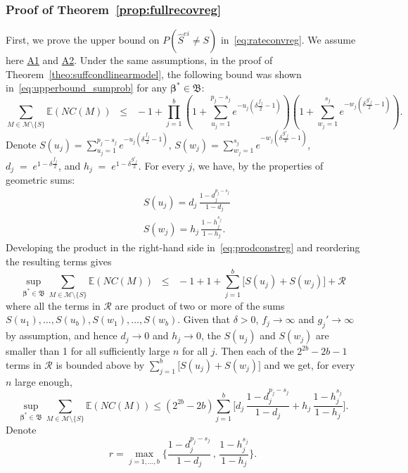 \documentclass[
  12pt]{article}
\newcommand{\E}{\mathbb{E}}
\newcommand{\M}{\mathcal{M}}
\newcommand{\bbeta}{\boldsymbol{\beta}}
\newcommand{\bB}{\mathfrak{B}}
\begin{document}
 \subsubsection{Proof of Theorem~\ref{prop:fullrecovreg}}

First, we prove the upper bound on $P(\hat{S}^{ei} \neq S)$ in~\eqref{eq:rateconvreg}. We assume here \hyperlink{lab:A1}{A1} and \hyperlink{lab:A2}{A2}. Under the same assumptions, in the proof of Theorem~\ref{theo:suffcondlinearmodel}, the following bound was shown in~\eqref{eq:upperbound_sumprob} for any $\bbeta^*\in \bB$:
\begin{equation}\label{eq:prodconstreg}
 \sum_{M \in \M\setminus \{S\}} \E\left(NC(M)\right)
    \;\;\leq\;\; - 1+\prod_{j=1}^b\left(1+\sum_{u_j=1}^{p_j-s_j}e^{-u_j\left(\delta \tfrac{f_j}{2}-1\right)}\right)\left(1+
    \sum_{w_j=1}^{s_j}    e^{-w_j\left(\delta \tfrac{g'_j}{2}-1\right)}\right) .
\end{equation}
Denote $S(u_j)=\sum_{u_j=1}^{p_j-s_j}e^{-u_j\left(\delta \tfrac{f_j}{2}-1\right)}$,  $S(w_j)=\sum_{w_j=1}^{s_j}    e^{-w_j\left(\delta \tfrac{g'_j}{2}-1\right)}$, $d_j\;=\;e^{1-\delta \tfrac{f_j}{2}}$, and $h_j\;=\;e^{1-\delta \tfrac{g'_j}{2}}$. For every $j$, we have, by the properties of geometric sums:
\begin{align*}
    &S(u_j)
    =d_j\,\frac{1-d_j^{p_j-s_j}}{1-d_j} \\
    &S(w_j) =h_j\,\frac{1-h_j^{s_j}}{1-h_j}.
\end{align*}
Developing the product in the right-hand side in~\eqref{eq:prodconstreg} and reordering the resulting terms gives
$$\sup_{\bbeta^*\in \bB}\sum_{M \in \M\setminus \{S\}} \E\left(NC(M)\right)\;\;\leq\;\;-1+1+\sum_{j=1}^b\big[S(u_j)+S(w_j)\big]+\mathcal{R}$$
where all the terms in $\mathcal{R}$ are product of two or more of the sums $S(u_1),\ldots,S(u_b),S(w_1),\ldots,S(w_b)$. Given that $\delta>0$, $f_j \to \infty$ and $g_j' \to \infty$ by assumption, and hence $d_j \to 0$ and $h_j \to 0$, the $S(u_j)$ and $S(w_j)$ are smaller than 1 for all sufficiently large $n$ for all $j$. Then each of the $2^{2b}-2b-1$ terms in $\mathcal{R}$ is bounded above by $\sum_{j=1}^b\big[S(u_j)+S(w_j)\big]$ and we get, for every $n$ large enough,
 \begin{equation} \label{eq:fierg}
 \sup_{\bbeta^*\in \bB}\sum_{M \in \M\setminus \{S\}} \E\left(NC(M)\right)
 \leq (2^{2b}-2b)\sum_{j=1}^b \bigg[d_j\,\frac{1-d_j^{p_j-s_j}}{1-d_j}+ h_j\,\frac{1-h_j^{s_j}}{1-h_j}\bigg ]. \end{equation} 
Denote
\begin{equation} \label{eq:fierg2}r=\max_{j=1,\ldots,b}\bigg\{\frac{1-d_j^{p_j-s_j}}{1-d_j} \,,\,\frac{1-h_j^{s_j}}{1-h_j} \bigg\}.\end{equation} 
\end{document}
